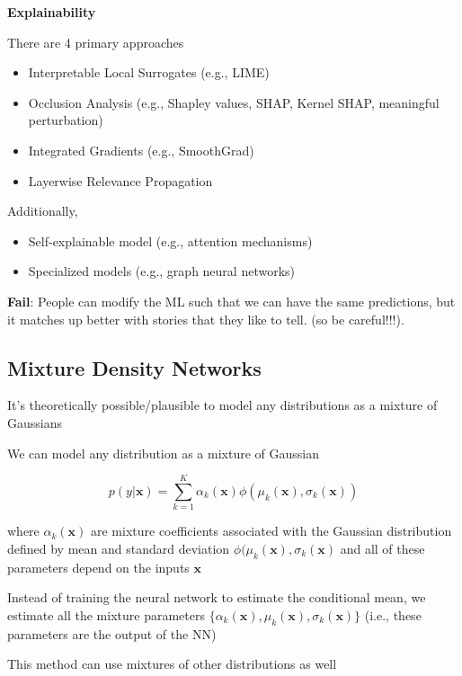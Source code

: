 \documentclass[
]{book}
\begin{document}
\textbf{Explainability}

There are 4 primary approaches \citep{samek2021a}

\begin{itemize}
\item
  Interpretable Local Surrogates (e.g., LIME)
\item
  Occlusion Analysis (e.g., Shapley values, SHAP, Kernel SHAP, meaningful perturbation)
\item
  Integrated Gradients (e.g., SmoothGrad)
\item
  Layerwise Relevance Propagation
\end{itemize}

Additionally,

\begin{itemize}
\item
  Self-explainable model (e.g., attention mechanisms)
\item
  Specialized models (e.g., graph neural networks)
\end{itemize}

\textbf{Fail}: People can modify the ML such that we can have the same predictions, but it matches up better with stories that they like to tell. (so be careful!!!).

\hypertarget{mixture-density-networks}{%
\subsection{Mixture Density Networks}\label{mixture-density-networks}}

It's theoretically possible/plausible to model any distributions as a mixture of Gaussians

We can model any distribution as a mixture of Gaussian

\[
p(y|\mathbf{x}) = \sum_{k=1}^K \alpha_k (\mathbf{x}) \phi(\mu_k(\mathbf{x}), \sigma_k (\mathbf{x}))
\]

where \(\alpha_k(\mathbf{x})\) are mixture coefficients associated with the Gaussian distribution defined by mean and standard deviation \(\phi(\mu_k(\mathbf{x}), \sigma_k (\mathbf{x})\) and all of these parameters depend on the inputs \(\mathbf{x}\)

Instead of training the neural network to estimate the conditional mean, we estimate all the mixture parameters \(\{ \alpha_k(\mathbf{x}), \mu_k (\mathbf{x}), \sigma_k (\mathbf{x})\}\) (i.e., these parameters are the output of the NN)

This method can use mixtures of other distributions as well
\end{document}
